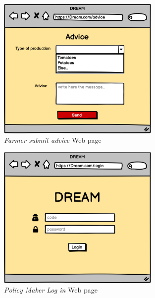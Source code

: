 \begin{figure}[H]
    \begin{center}
    \includegraphics[width=0.7\textwidth]{mocups/Advice.png}
    \caption{\emph{Farmer submit advice} Web page}
    \label{fig:submit advice}
    \end{center}
\end{figure}

\begin{figure}[H]
    \begin{center}
    \includegraphics[width=0.7\textwidth]{mocups/PMLogIn.png}
    \caption{\emph{Policy Maker Log in} Web page}
    \label{fig:PMlogin}
    \end{center}
\end{figure}

